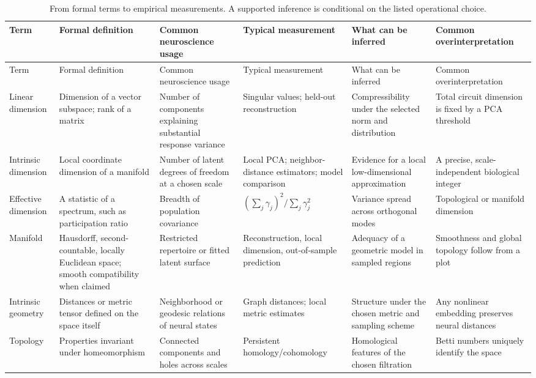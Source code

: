 {\scriptsize
\setlength{\tabcolsep}{2pt}
\begin{longtable}{>{\raggedright\arraybackslash}p{.10\linewidth}>{\raggedright\arraybackslash}p{.18\linewidth}>{\raggedright\arraybackslash}p{.16\linewidth}>{\raggedright\arraybackslash}p{.17\linewidth}>{\raggedright\arraybackslash}p{.18\linewidth}>{\raggedright\arraybackslash}p{.13\linewidth}}
\caption{From formal terms to empirical measurements. A supported inference is conditional on the listed operational choice.}\label{tab:12-dictionary}\\
\toprule
Term & Formal definition & Common neuroscience usage & Typical measurement & What can be inferred & Common overinterpretation\\
\midrule
\endfirsthead
\toprule
Term & Formal definition & Common neuroscience usage & Typical measurement & What can be inferred & Common overinterpretation\\
\midrule
\endhead
\bottomrule
\endfoot
Linear dimension & Dimension of a vector subspace; rank of a matrix & Number of components explaining substantial response variance & Singular values; held-out reconstruction & Compressibility under the selected norm and distribution & Total circuit dimension is fixed by a PCA threshold\\
Intrinsic dimension & Local coordinate dimension of a manifold & Number of latent degrees of freedom at a chosen scale & Local PCA; neighbor-distance estimators; model comparison & Evidence for a local low-dimensional approximation & A precise, scale-independent biological integer\\
Effective dimension & A statistic of a spectrum, such as participation ratio & Breadth of population covariance & \((\sum_j\gamma_j)^2/\sum_j\gamma_j^2\) & Variance spread across orthogonal modes & Topological or manifold dimension\\
Manifold & Hausdorff, second-countable, locally Euclidean space; smooth compatibility when claimed & Restricted repertoire or fitted latent surface & Reconstruction, local dimension, out-of-sample prediction & Adequacy of a geometric model in sampled regions & Smoothness and global topology follow from a plot\\
Intrinsic geometry & Distances or metric tensor defined on the space itself & Neighborhood or geodesic relations of neural states & Graph distances; local metric estimates & Structure under the chosen metric and sampling scheme & Any nonlinear embedding preserves neural distances\\
Topology & Properties invariant under homeomorphism & Connected components and holes across scales & Persistent homology/cohomology & Homological features of the chosen filtration & Betti numbers uniquely identify the space\\

\end{longtable}}
